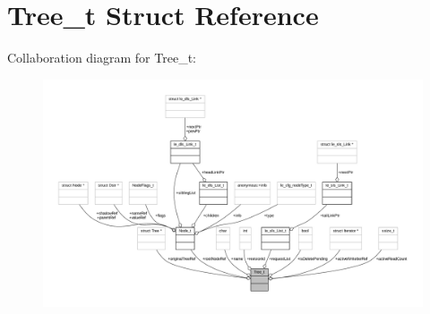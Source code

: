 \hypertarget{struct_tree__t}{}\section{Tree\+\_\+t Struct Reference}
\label{struct_tree__t}


Collaboration diagram for Tree\+\_\+t\+:
\nopagebreak
\begin{figure}[H]
\begin{center}
\leavevmode
\includegraphics[width=350pt]{struct_tree__t__coll__graph}
\end{center}
\end{figure}
